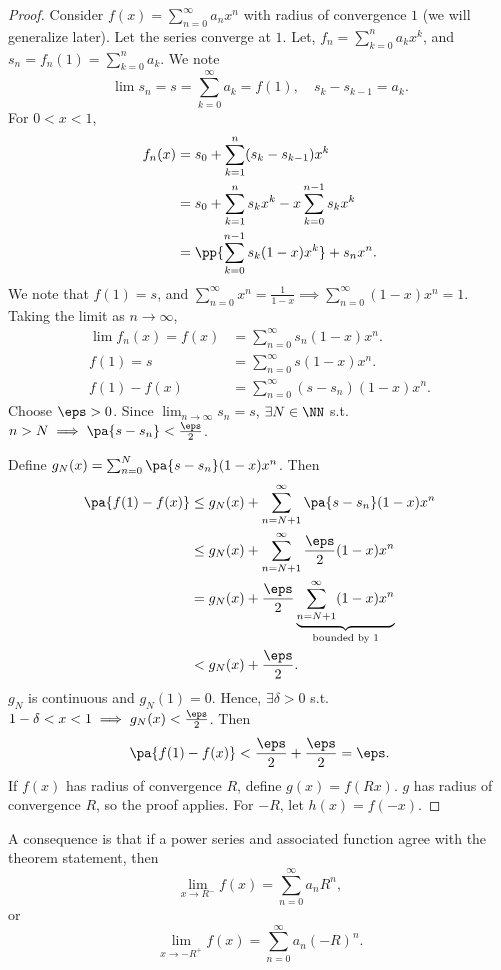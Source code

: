 \documentclass[11pt]{scrartcl}
\numberwithin{equation}{section}
\begin{document}
\begin{proof}
    Consider $f(x)=\sum_{n=0}^{\infty}a_nx^n$ with radius of convergence 
    $1$ (we will generalize later). Let the series converge at $1$. Let,
    $f_n=\sum_{k=0}^{n}a_kx^k$, and $s_n = f_n(1) = \sum_{k=0}^{n}a_k$.
    We note 
    \[
        \lim s_n=s=\sum_{k=0}^{\infty}a_k=f(1),\quad s_k-s_{k-1}=a_k.
    \]
    For $0<x<1$,
    \begin{align*}
        f_n(x)&=s_0+\sum_{k=1}^{n}(s_k-s_{k-1})x^k \\
        &= s_0+\sum_{k=1}^{n}s_kx^k - x \sum_{k=0}^{n-1}s_kx^k \\
        &= \pp{\sum_{k=0}^{n-1}s_k(1-x)x^k}+s_nx^n.
    \end{align*}
    We note that $f(1)=s$, and $\sum_{n=0}^{\infty}x^n=\frac{1}{1-x}
    \implies \sum_{n=0}^{\infty}(1-x)x^n=1$.
    Taking the limit as $n\to\infty$,
    \begin{align*}
        \lim f_n(x) = f(x) &= \sum_{n=0}^{\infty}s_n(1-x)x^n. \\ 
        f(1) = s &= \sum_{n=0}^{\infty}s(1-x)x^n.\\
        f(1)-f(x) &= \sum_{n=0}^{\infty}(s-s_n)(1-x)x^n.
    \end{align*}
    Choose $\eps>0$. Since $\lim_{n\rightarrow \infty}s_n=s$, 
    $\exists N\in\NN$ s.t. $n>N\implies \pa{s-s_n}<\frac{\eps}{2}$.

    Define $g_N(x)=\sum_{n=0}^{N}\pa{s-s_n}(1-x)x^n$.
    Then 
    \begin{align*}
        \pa{f(1)-f(x)} &\leq g_N(x) + \sum_{n=N+1}^{\infty}\pa{s-s_n}(1-x)x^n\\
        &\leq g_N(x) + \sum_{n=N+1}^{\infty}\frac{\eps}{2}(1-x)x^n \\
        &= g_N(x) + \frac{\eps}{2}\underbrace{\sum_{n=N+1}^{\infty}(1-x)x^n}_{\text{bounded by $1$}}\\
        &< g_N(x)+\frac{\eps}{2}.
    \end{align*}
    $g_N$ is continuous and $g_N(1)=0$. Hence, $\exists \delta>0$ s.t. 
    $1-\delta<x<1\implies g_N(x)<\frac{\eps}{2}$.
    Then 
    \[
        \pa{f(1)-f(x)}<\frac{\eps}{2}+\frac{\eps}{2}=\eps.
    \]
    If $f(x)$ has radius of convergence $R$, define $g(x)=f(Rx)$.
    $g$ has radius of convergence $R$, so the proof applies.
    For $-R$, let $h(x)=f(-x)$.
\end{proof}

A consequence is that if a power series and associated function 
agree with the theorem statement, then 
\[
    \lim_{x\rightarrow R^-}f(x) = \sum_{n=0}^{\infty}a_nR^n,
\]
or
\[
    \lim_{x\rightarrow -R^+}f(x) = \sum_{n=0}^{\infty}a_n(-R)^n.
\]
\end{document}
